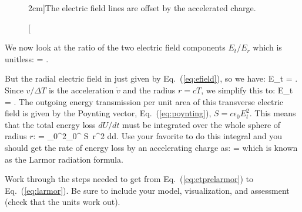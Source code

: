 \begin{figure}
\centering
{}
\caption[][2cm]{The electric field lines are offset by the accelerated charge.}
\label{fig:larmor}
\end{figure}

We now look at the ratio of the two electric field components $E_t/E_r$ which is unitless:
\beq
{} = .
\eeq

But the radial electric field in just given by Eq.~(\ref{eq:efield}), so we have:
\beq
E_t =  \sin\theta.
\label{eq:etprelarmor}
\eeq
Since $v/\Delta T$ is the acceleration $\dot{v}$ and the radius $r = cT$, we simplify this to:
\beq
E_t =  \sin\theta.
\eeq
The outgoing energy transmission per unit area of this transverse electric field is given by the Poynting vector, Eq.~(\ref{eq:poynting}), $S =c\epsilon_0E_t^2$. This means that the total energy loss $dU/dt$ must be integrated over the whole sphere of radius $r$:
\beq
{} = \int_{0}^{2\pi}\int_{0}^{\pi} S\ r^2 \sin\theta d\theta d\phi.
\label{eq:dudtprelarmor}
\eeq
Use your favorite \CAS to do this integral and you should get the rate of energy loss by an accelerating charge as:
\beq
{} = 
\label{eq:larmor}
\eeq{}
which is known as the Larmor radiation formula.
\begin{exercise}
Work through the steps needed to get from Eq.~(\ref{eq:etprelarmor}) to Eq.~(\ref{eq:larmor}). Be sure to include your model, visualization, and assessment (\ie check that the units work out).
\end{exercise}



